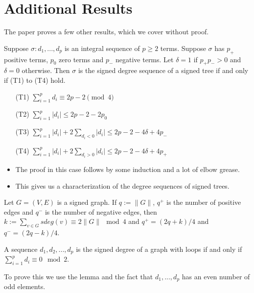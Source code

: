 \section{Additional Results}

\begin{frame}
	The paper proves a few other results, which we cover without proof.
		\begin{theorem}
			Suppose $\sigma : d_1,...,d_p$ is an integral sequence of $p \geq 2$ terms. Suppose $\sigma$ has $p_+$ positive terms, $p_0$ zero terms and $p_-$ negative terms. Let $\delta = 1$ if $p_+p_- > 0$ and $\delta = 0$ otherwise. Then $\sigma$ is the signed degree sequence of a signed tree if and only if (T1) to (T4) hold.
			\begin{itemize}
				\item[(T1)] $\sum_{i = 1}^{p} d_i \equiv 2p - 2 \pmod 4$
				\item[(T2)] $\sum_{i = 1}^{p} \lvert d_i \rvert \le 2p - 2 - 2p_0$
				\item[(T3)] $\sum_{i = 1}^{p} \lvert d_i \rvert + 2\sum_{d_i < 0} \lvert d_i \rvert \leq 2p - 2 - 4\delta + 4p_-$
				\item[(T4)] $\sum_{i = 1}^{p} \lvert d_i \rvert + 2\sum_{d_i > 0} \lvert d_i \rvert \leq 2p - 2 - 4\delta + 4p_+$
			\end{itemize}
		\end{theorem}
	\begin{itemize}
		\item The proof in this case follows by some induction and a lot of elbow grease.
		\item This gives us a characterization of the degree sequences of signed trees.
	\end{itemize}
\end{frame}

\begin{frame}
	\begin{lemma}
		Let $G = (V,E)$ is a signed graph. If $q := \lVert G \rVert$, $q^+$ is the number of positive edges and $q^-$ is the number of negative edges, then $k := \sum_{v \in G} sdeg(v) \equiv 2\lVert G \rVert \mod 4$ and $q^+ = (2q+k)/4$ and $q^- = (2q-k)/4$.
	\end{lemma}
	\begin{theorem}
		A sequence $d_1, d_2, ..., d_p$ is the signed degree of a graph with loops if and only if $\sum_{i = 1}^{p} d_i \equiv 0 \mod 2$.
	\end{theorem}
	To prove this we use the lemma and the fact that $d_1,...,d_p$ has an even number of odd elements.
\end{frame}


